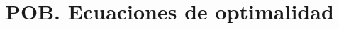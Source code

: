 \documentclass[aspectratio=169]{beamer}
\begin{document}

\section{POB. Ecuaciones de optimalidad}
\end{document}
